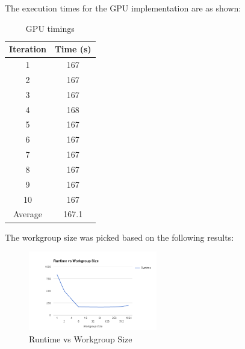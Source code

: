 \documentclass[journal,transmag]{IEEEtran}
\begin{document}
        The execution times for the GPU implementation are as shown:
        \begin{table}[h]
            \centering
            \caption{GPU timings}
            \label{GPUTable}
            \begin{tabular}{ c c }
                Iteration & Time (s) \\
                \hline
                \hline
                1         & 167 \\
                2         & 167 \\
                3         & 167 \\
                4         & 168 \\
                5         & 167 \\
                6         & 167 \\
                7         & 167 \\
                8         & 167 \\
                9         & 167 \\
                10        & 167 \\
                \hline
                Average   & 167.1 \\
            \end{tabular}
        \end{table}

        The workgroup size was picked based on the following results:
        \begin{figure}[h]
            \centering
            \includegraphics[width=0.5\textwidth]{report/images/RuntimeVsWorkgroupSize.png}
            \caption{Runtime vs Workgroup Size}
        \end{figure}
\end{document}
